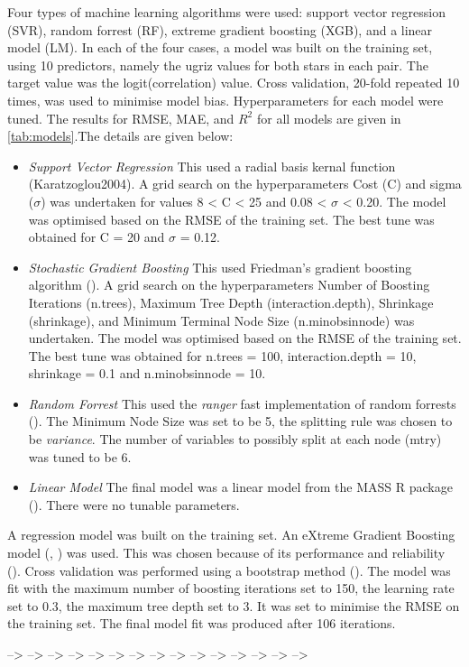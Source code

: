 \documentclass[preprint, 3p,
authoryear]{elsarticle} %
\begin{document}
Four types of machine learning algorithms were used: support vector
regression (SVR), random forrest (RF), extreme gradient boosting (XGB),
and a linear model (LM). In each of the four cases, a model was built on
the training set, using 10 predictors, namely the ugriz values for both
stars in each pair. The target value was the logit(correlation) value.
Cross validation, 20-fold repeated 10 times, was used to minimise model
bias. Hyperparameters for each model were tuned. The results for RMSE,
MAE, and \(R^2\) for all models are given in \ref{tab:models}.The
details are given below:

\begin{itemize}
\item
  \emph{Support Vector Regression} This used a radial basis kernal
  function (Karatzoglou2004). A grid search on the hyperparameters Cost
  (C) and sigma (\(\sigma\)) was undertaken for values 8 \textless{} C
  \textless{} 25 and 0.08 \textless{} \(\sigma\) \textless{} 0.20. The
  model was optimised based on the RMSE of the training set. The best
  tune was obtained for C = 20 and \(\sigma\) = 0.12.
\item
  \emph{Stochastic Gradient Boosting} This used Friedman's gradient
  boosting algorithm (\citet{Boehmke2019}). A grid search on the
  hyperparameters Number of Boosting Iterations (n.trees), Maximum Tree
  Depth (interaction.depth), Shrinkage (shrinkage), and Minimum Terminal
  Node Size (n.minobsinnode) was undertaken. The model was optimised
  based on the RMSE of the training set. The best tune was obtained for
  n.trees = 100, interaction.depth = 10, shrinkage = 0.1 and
  n.minobsinnode = 10.
\item
  \emph{Random Forrest} This used the \emph{ranger} fast implementation
  of random forrests (\citet{Wright2017}). The Minimum Node Size was set
  to be 5, the splitting rule was chosen to be \emph{variance}. The
  number of variables to possibly split at each node (mtry) was tuned to
  be 6.
\item
  \emph{Linear Model} The final model was a linear model from the MASS R
  package (\citet{Venables2002}). There were no tunable parameters.
\end{itemize}

A regression model was built on the training set. An eXtreme Gradient
Boosting model (\citet{Friedman2000}, \citet{Chen2021}) was used. This
was chosen because of its performance and reliability
(\citet{Bentejac2020}). Cross validation was performed using a bootstrap
method (\citet{Efron1983}). The model was fit with the maximum number of
boosting iterations set to 150, the learning rate set to 0.3, the
maximum tree depth set to 3. It was set to minimise the RMSE on the
training set. The final model fit was produced after 106 iterations.

--\textgreater{} --\textgreater{} --\textgreater{} --\textgreater{}
--\textgreater{} --\textgreater{} --\textgreater{} --\textgreater{}
--\textgreater{} --\textgreater{} --\textgreater{} --\textgreater{}
--\textgreater{} --\textgreater{} --\textgreater{}

\renewcommand\refname{References}

\end{document}
